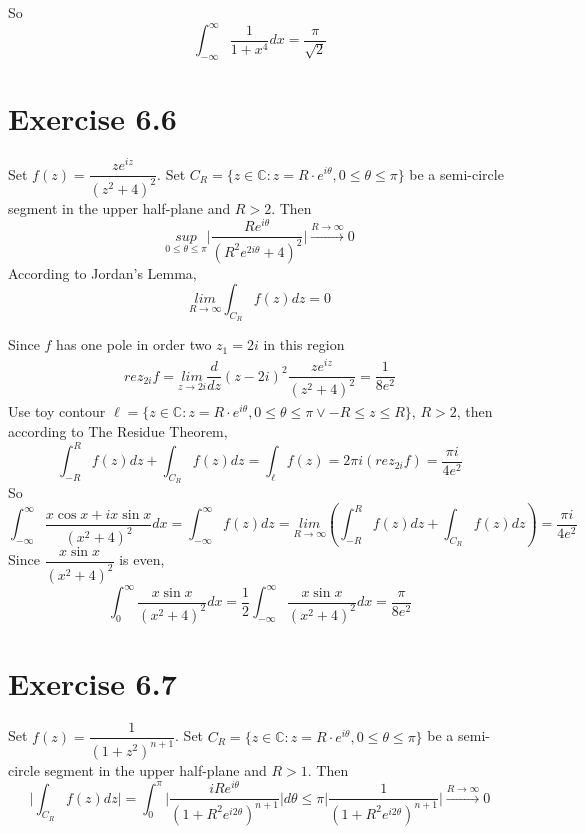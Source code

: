 \documentclass[a4paper,12pt,titlepage]{article}
\begin{document}
So $$\int_{-\infty}^{\infty}\dfrac{1}{1+x^4}dx=\dfrac{\pi}{\sqrt{2}}$$

\section*{Exercise 6.6}
Set $f(z)=\dfrac{ze^{iz}}{(z^2+4)^2}$. 
Set $C_R = \lbrace z \in \mathbb{C}: z = R\cdot e^{i\theta}, 0 \leqslant \theta \leqslant \pi\rbrace$ be a semi-circle segment in the upper half-plane and $R>2$.  Then
$$\underset{0\leqslant \theta\leqslant\pi}{sup}
\big|\dfrac{Re^{i\theta}}{(R^2e^{2i\theta}+4)^2}\big|\xrightarrow{R\rightarrow\infty}0$$
According to Jordan's Lemma, 
$$\underset{R\rightarrow \infty}{lim}\int_{C_R}f(z)dz=0$$

Since $f$ has one pole in order two $z_1=2i$ in this region
\begin{align*}
rez_{2i}f=\underset{z\rightarrow 2i}{lim}\dfrac{d}{dz}
(z-2i)^2\dfrac{ze^{iz}}{(z^2+4)^2}=\dfrac{1}{8e^2}
\end{align*}
Use toy contour $\ell= \lbrace z \in \mathbb{C}: z = R\cdot e^{i\theta}, 0 \leqslant \theta \leqslant \pi \vee -R\leqslant z\leqslant R\rbrace$, $R>2$, then according to The Residue Theorem, 
$$\int_{-R}^Rf(z)dz+\int_{C_R}f(z)dz=\int_{\ell}f(z)=2\pi i(rez_{2i}f)=\dfrac{\pi i}{4e^2}$$
So
$$\int_{-\infty}^{\infty}\dfrac{x\cos x+ix\sin x}{(x^2+4)^2}dx=\int_{-\infty}^{\infty}f(z)dz=\underset{R\rightarrow \infty}{lim}(\int_{-R}^Rf(z)dz+\int_{C_R}f(z)dz)=\dfrac{\pi i}{4e^2}$$
Since $\dfrac{x\sin x}{(x^2+4)^2}$ is even,
$$\int_{0}^{\infty}\dfrac{x\sin x}{(x^2+4)^2}dx=\dfrac{1}{2}\int_{-\infty}^{\infty}\dfrac{x\sin x}{(x^2+4)^2}dx=\dfrac{\pi }{8e^2}$$


\section*{Exercise 6.7}
Set $f(z)=\dfrac{1}{(1+z^2)^{n+1}}$. 
Set $C_R = \lbrace z \in \mathbb{C}: z = R\cdot e^{i\theta}, 0 \leqslant \theta \leqslant \pi\rbrace$ be a semi-circle segment in the upper half-plane and $R>1$.  Then
$$\Big|\int_{C_R}f(z)dz\Big|=\int_0^{\pi}\Big|\dfrac{iRe^{i\theta}}{(1+R^2e^{i2\theta})^{n+1}}\Big|d\theta\leqslant\pi\Big|\dfrac{1}{(1+R^2e^{i2\theta})^{n+1}}\Big|\xrightarrow{R\rightarrow\infty}0$$
\end{document}
